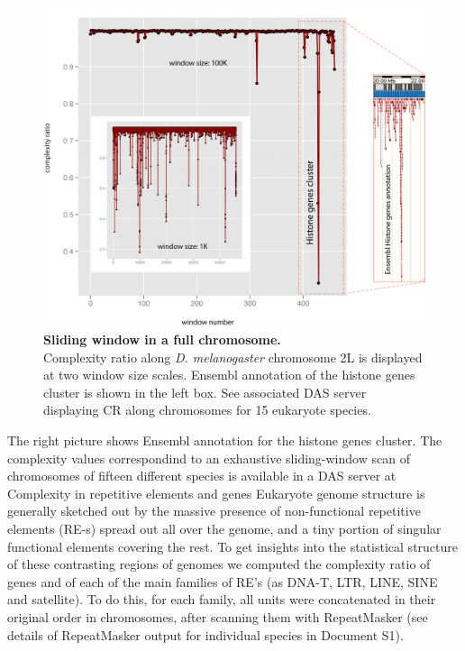 \begin{figure}[htpb] 
\centering 
\includegraphics[width=\textwidth]{tex_source/figures/dna_struct/windows_2L.png}
\caption[Sliding window in a full chromosome]{{\bf Sliding window in a full chromosome.} \\Complexity ratio along \textit{D. melanogaster} chromosome 2L is displayed at two window size scales. Ensembl annotation of the histone genes cluster is shown in the left box. See associated DAS server displaying CR along chromosomes for 15 eukaryote species.
}
\label{fig:win_2L}
\end{figure}


The right picture shows Ensembl annotation for the histone genes cluster. The complexity values correspondind to an exhaustive sliding-window scan of chromosomes of fifteen different species is available in a DAS server at  Complexity in repetitive elements and genes
Eukaryote genome structure is generally sketched out by the massive presence of non-functional repetitive elements (RE-s) spread out all over the genome, and a tiny portion of singular functional elements covering the rest. To get insights into the statistical structure of these contrasting regions of genomes we computed the complexity ratio of genes and of each of the main families of RE's (as DNA-T, LTR, LINE, SINE and satellite). To do this, for each family, all units were concatenated in their original order in chromosomes, after
scanning them with RepeatMasker (see details of RepeatMasker output for individual species in Document S1).

